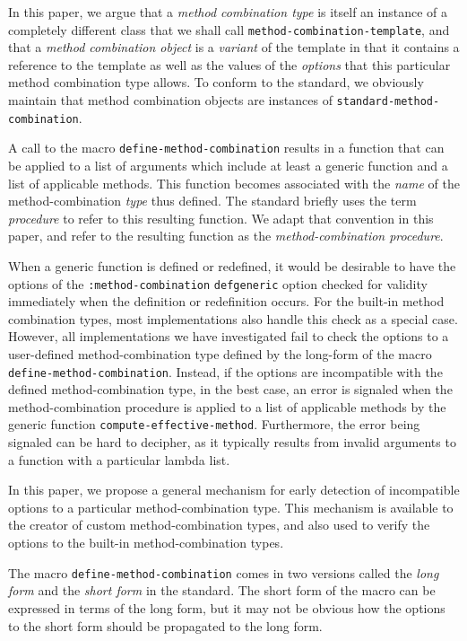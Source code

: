 In this paper, we argue that a \emph{method combination type} is
itself an instance of a completely different class that we shall call
\texttt{method-combination-template}, and that a \emph{method
  combination object} is a \emph{variant} of the template in that it
contains a reference to the template as well as the values of the
\emph{options} that this particular method combination type allows.
To conform to the standard, we obviously maintain that method
combination objects are instances of
\texttt{standard-method-combination}.

A call to the macro \texttt{define-method-combination} results in a
function that can be applied to a list of arguments which include at
least a generic function and a list of applicable methods.  This
function becomes associated with the \emph{name} of the
method-combination \emph{type} thus defined.  The standard briefly
uses the term \emph{procedure} to refer to this resulting function.
We adapt that convention in this paper, and refer to the resulting
function as the \emph{method-combination procedure}.

When a generic function is defined or redefined, it would be desirable
to have the options of the \texttt{:method-combination}
\texttt{defgeneric} option checked for validity immediately when the
definition or redefinition occurs.  For the built-in method
combination types, most implementations also handle this check as a
special case.  However, all implementations we have investigated fail
to check the options to a user-defined method-combination type defined
by the long-form of the macro \texttt{define-method-combination}.
Instead, if the options are incompatible with the defined
method-combination type, in the best case, an error is signaled when
the method-combination procedure is applied to a list of applicable
methods by the generic function \texttt{compute-effective-method}.
Furthermore, the error being signaled can be hard to decipher, as it
typically results from invalid arguments to a function with a
particular lambda list.

In this paper, we propose a general mechanism for early detection of
incompatible options to a particular method-combination type.  This
mechanism is available to the creator of custom method-combination
types, and also used to verify the options to the built-in
method-combination types.

The macro \texttt{define-method-combination} comes in two versions
called the \emph{long form} and the \emph{short form} in the
\commonlisp{} standard.  The short form of the macro can be expressed
in terms of the long form, but it may not be obvious how the options
to the short form should be propagated to the long form.

